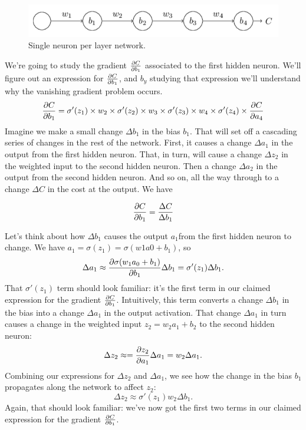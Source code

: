{\begin{figure}
\centering
\includegraphics[scale=0.5]{img/singleNeuronNetwork}
\caption{Single neuron per layer network.}
\label{singleNeuronNetwork}
\end{figure}
We're going to study the gradient $\frac{\mathrm{\partial} C}{\mathrm{\partial} b_1}$ associated to the first hidden neuron. We'll figure out an expression for $\frac{\mathrm{\partial} C}{\mathrm{\partial} b_1}$, and $b_y$ studying that expression we'll understand why the vanishing gradient problem occurs.
\begin{equation}
\frac{\mathrm{\partial} C}{\mathrm{\partial} b_1} = \sigma'(z_1) \times w_2 \times \sigma'(z_2)\times w_3 \times \sigma'(z_3) \times w_4 \times \sigma'(z_4) \times \frac{\mathrm{\partial} C}{\mathrm{\partial} a_4}
\end{equation}
Imagine we make a small change $\Delta b_1$ in the bias $b_1$. That will set off a cascading series of changes in the rest of the network. First, it causes a change $\Delta a_1$ in the output from the first hidden neuron. That, in turn, will cause a change $\Delta z_2$ in the weighted input to the second hidden neuron. Then a change $\Delta a_2$ in the output from the second hidden neuron. And so on, all the way through to a change $\Delta C$ in the cost at the output. We have

\begin{equation}
\frac{\mathrm{\partial} C}{\mathrm{\partial} b_1} = \frac{\Delta C}{\Delta b_1}
\end{equation}

Let's think about how $\Delta b_1$ causes the output $a_1 $from the first hidden neuron to change. We have $a_1=\sigma(z_1)=\sigma(w1a0+b_1)$, so 
\begin{equation}
\Delta a_1\approx \frac{\mathrm{\partial} \sigma(w_1a_0+b_1)}{\mathrm{\partial} b_1}\Delta b_1 = \sigma'(z_1)\Delta b_1. 
\end{equation}
That $\sigma'(z_1)$ term should look familiar: it's the first term in our claimed expression for the gradient $\frac{\mathrm{\partial} C}{\mathrm{\partial} b_1}$. Intuitively, this term converts a change $\Delta b_1$ in the bias into a change $\Delta a_1$ in the output activation. That change $\Delta a_1$ in turn causes a change in the weighted input $z_2=w_2a_1+b_2$ to the second hidden neuron:
\begin{equation}
\Delta z_2\approx=\frac{\mathrm{\partial} z_2}{\mathrm{\partial} a_1} \Delta a_1 = w_2\Delta a_1.
\end{equation}
Combining our expressions for $\Delta z_2$ and $\Delta a_1$, we see how the change in the bias $b_1$ propagates along the network to affect $z_2$:
\begin{equation}
\Delta z_2\approx\sigma'(z_1)w_2\Delta b_1.
\end{equation}
Again, that should look familiar: we've now got the first two terms in our claimed expression for the gradient $\frac{\mathrm{\partial} C}{\mathrm{\partial} b_1}$.

}
